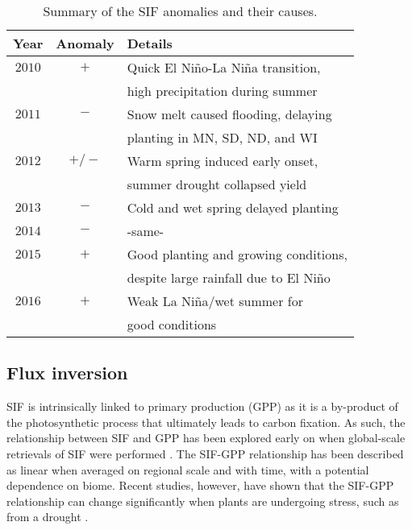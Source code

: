 \documentclass[preprint, a4paper, 10pt, times, 5p]{elsarticle}
\begin{document}


\begin{table}[htp]
\begin{center}
\begin{tabular}{c|c|l}
Year & Anomaly & Details \\
\hline
$2010$ & $+$   & Quick El Ni\~no-La Ni\~na transition, \\
             & & high precipitation during summer \\
$2011$ & $-$   & Snow melt caused flooding, delaying \\
             & & planting in MN, SD, ND, and WI \\
$2012$ & $+/-$ & Warm spring induced early onset, \\
             & & summer drought collapsed yield \\
$2013$ & $-$   & Cold and wet spring delayed planting \\
$2014$ & $-$   & -same- \\
$2015$ & $+$   & Good planting and growing conditions, \\
             & & despite large rainfall due to El Ni\~no \\
$2016$ & $+$   & Weak La Ni\~na/wet summer for \\
             & & good conditions \\
\end{tabular}
\end{center}
\label{tbl:anomaly_table}
\caption{Summary of the SIF anomalies and their causes.}
\end{table}%


\subsection{Flux inversion}

SIF is intrinsically linked to primary production (GPP) as it is a by-product of the photosynthetic process that ultimately leads to carbon fixation. As such, the relationship between SIF and GPP has been explored early on when global-scale retrievals of SIF were performed \citep{Joiner2011,Frankenberg2011,Guanter2012}. The SIF-GPP relationship has been described as linear when averaged on regional scale and with time, with a potential dependence on biome. Recent studies, however, have shown that the SIF-GPP relationship can change significantly when plants are undergoing stress, such as from a drought \citep{Wieneke2018,Wohlfahrt2018}.
\end{document}
